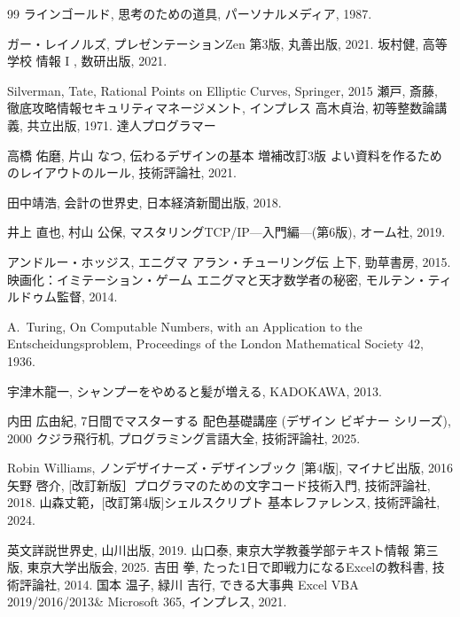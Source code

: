 \documentclass[book, paper=a4paper, 11pt]{jlreq}
\theoremstyle{definition}
\theoremstyle{remark}
\begin{document}
\begin{thebibliography}{99}
      ラインゴールド, 思考のための道具, パーソナルメディア, 1987.
         
       ガー・レイノルズ, プレゼンテーションZen 第3版, 丸善出版, 2021.
      坂村健, 高等学校 情報 I , 数研出版, 2021.   

    Silverman, Tate,
   Rational Points on Elliptic Curves, Springer, 2015 
    瀬戸, 斎藤, 徹底攻略情報セキュリティマネージメント, インプレス   
      高木貞治, 初等整数論講義, 共立出版, 1971.
      達人プログラマー

    高橋 佑磨, 片山 なつ, 
    伝わるデザインの基本 増補改訂3版 
    よい資料を作るためのレイアウトのルール, 技術評論社, 2021.
   
   
    田中靖浩, 会計の世界史, 日本経済新聞出版, 2018.

     井上 直也, 村山 公保, 
     マスタリングTCP/IP—入門編—(第6版), オーム社, 2019.
  

      アンドルー・ホッジス, エニグマ アラン・チューリング伝 上下,
      勁草書房, 2015.
      映画化：イミテーション・ゲーム エニグマと天才数学者の秘密,
      モルテン・ティルドゥム監督, 2014.

      
       A.~Turing, On Computable Numbers, with an Application to the Entscheidungsproblem, Proceedings of the London Mathematical Society 42, 1936.
       

   宇津木龍一, シャンプーをやめると髪が増える, KADOKAWA, 2013.
   
       内田 広由紀, 7日間でマスターする 配色基礎講座 
       (デザイン ビギナー シリーズ), 2000
     クジラ飛行机, プログラミング言語大全, 技術評論社, 2025.

       Robin Williams,  ノンデザイナーズ・デザインブック [第4版], 
       マイナビ出版, 2016
      矢野 啓介, 
      [改訂新版］プログラマのための文字コード技術入門, 技術評論社, 2018.    
   山森丈範，[改訂第4版]シェルスクリプト 基本レファレンス, 技術評論社, 2024.

      英文詳説世界史, 山川出版, 2019. 
      山口泰, 東京大学教養学部テキスト情報 第三版, 
      東京大学出版会, 2025.
      吉田 拳, たった1日で即戦力になるExcelの教科書, 技術評論社, 2014.
   国本 温子, 緑川 吉行, できる大事典 Excel VBA 2019/2016/2013\& Microsoft 365, インプレス, 2021.


\end{thebibliography}
\end{document}
